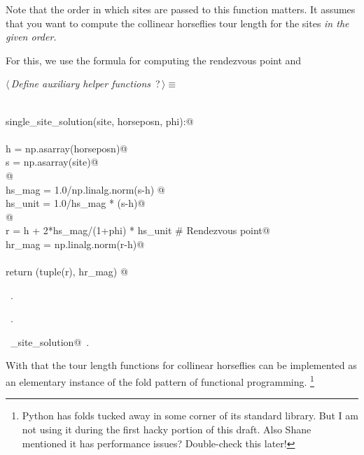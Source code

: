 \documentclass[11.5pt]{report}
\begin{document}
Note that the order in which sites are passed to this function matters. It 
assumes that you want to compute the collinear horseflies tour length for the 
sites \textit{in the given order.} 

For this, we use the formula for computing the rendezvous point and  

\begin{center}
\end{center}

\begin{flushleft} \small\label{scrap31}\raggedright\small
{} $\langle\,${\itshape Define auxiliary helper functions}\nobreak\ {\footnotesize {?}}$\,\rangle\equiv$
\vspace{-1ex}
\begin{list}{}{} \item
\mbox{}\verb@@\\
\mbox{}\verb@def single_site_solution(site, horseposn, phi):@\\
\mbox{}\verb@@\\
\mbox{}\verb@     h = np.asarray(horseposn)@\\
\mbox{}\verb@     s = np.asarray(site)@\\
\mbox{}\verb@     @\\
\mbox{}\verb@     hs_mag  = 1.0/np.linalg.norm(s-h) @\\
\mbox{}\verb@     hs_unit = 1.0/hs_mag * (s-h)@\\
\mbox{}\verb@     @\\
\mbox{}\verb@     r      = h +  2*hs_mag/(1+phi) * hs_unit # Rendezvous point@\\
\mbox{}\verb@     hr_mag = np.linalg.norm(r-h)@\\
\mbox{}\verb@@\\
\mbox{}\verb@     return (tuple(r), hr_mag) @\\
\mbox{}\verb@@{\NWsep}
\end{list}
\vspace{-1.5ex}
\footnotesize
\begin{list}{}{\setlength{\itemsep}{-\parsep}\setlength{\itemindent}{-\leftmargin}}
\item \NWtxtMacroDefBy\ .
\item \NWtxtMacroRefIn\ .
\item \NWtxtIdentsDefed\nobreak\  \verb@single_site_solution@\nobreak\ .
\item{}
\end{list}
\vspace{4ex}
\end{flushleft}
With that the tour length functions for collinear horseflies can be implemented as 
an elementary instance of the fold pattern of functional programming. 
\footnote{Python has folds tucked away in some corner of its standard library. 
But I am not using it during the first hacky portion of this draft. Also Shane 
mentioned it has performance issues? Double-check this later!}
\end{document}
